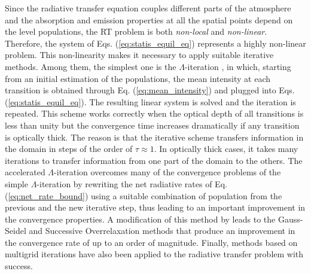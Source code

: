 \documentclass[12pt]{article}
\begin{document}
Since the radiative transfer equation couples different parts of the atmosphere and
the absorption and emission properties at all the spatial points depend on the level
populations, the RT problem is both \emph{non-local} and \emph{non-linear}.
Therefore, the system of Eqs. (\ref{eq:statis_equil_eq}) represents a highly
non-linear problem. This non-linearity makes it necessary to apply suitable iterative
methods. Among them, the simplest one is the $\Lambda$-iteration \citep[e.g.,][]{mihalas78},
in which, starting from an initial estimation of the populations, the mean intensity at each
transition is obtained through Eq. (\ref{eq:mean_intensity}) and plugged into
Eqs. (\ref{eq:statis_equil_eq}). The resulting linear system is solved and the iteration is
repeated. This scheme works correctly when the optical depth of all transitions is
less than unity but the convergence time increases dramatically if any transition is optically
thick. The reason is that the iterative scheme transfers information in the domain in steps
of the order of $\tau \approx 1$. In optically thick cases, it takes many iterations to
transfer information from one part of the domain to the others. The accelerated $\Lambda$-iteration
\citep{rybicki_hummer91,rybicki_hummer92} overcomes many of the convergence problems
of the simple $\Lambda$-iteration by rewriting the net radiative rates of
Eq. (\ref{eq:net_rate_bound}) using a suitable combination of population from the
previous and the new iterative step, thus leading to an important improvement in
the convergence properties. A modification of this method by \cite{trujillo_fabiani95}
leads to the Gauss-Seidel and Successive Overrelaxation methods that produce an
improvement in the convergence rate of up to an order of magnitude. Finally, methods
based on multigrid iterations \cite{steiner91,fabiani_trujillo_auer97} have also
been applied to the radiative transfer problem with success.

\end{document}
